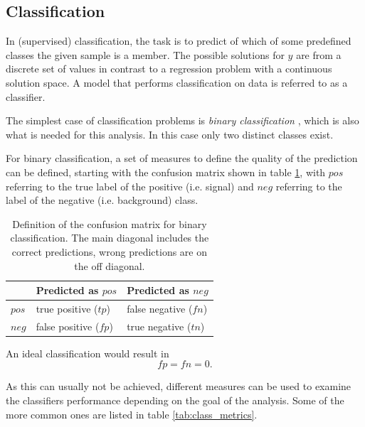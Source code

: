 \subsection{Classification}
In (supervised) classification, the task is to predict of which of some
predefined classes the given sample is a member. The possible solutions for $y$
are from a discrete set of values in
contrast to a regression problem with a continuous solution space.
A model that performs classification on data is referred to as a
classifier.

The simplest case of classification problems
is \textit{binary classification} \cite{sokolova2009systematic},
which is also what is needed for this analysis.
In this case only two distinct
classes exist.

For binary classification, a set of measures
to define the quality of the prediction can be defined, starting with the confusion matrix
shown in table \ref{tab:confusion},
with $pos$ referring to the true label of the positive (i.e. signal)
and $neg$ referring to the label of the negative (i.e. background) class.

\begin{table}
    \caption{Definition of the confusion matrix for binary classification.
    The main diagonal includes the correct predictions, wrong predictions are on the off diagonal.}
    \begin{center}
        \begin{tabular}{ l| l l}
            {} & Predicted as $pos$ & Predicted as $neg$ \\
            \hline
            $pos$ & true positive ($tp$) & false negative ($fn$) \\
            $neg$ & false positive ($fp$) & true negative ($tn$) \\
        \end{tabular}
    \end{center}
    \label{tab:confusion}
\end{table}

An ideal classification would result in
\begin{equation*}
  fp = fn = 0.
\end{equation*}

As this can usually not be achieved, different measures
can be used to examine the classifiers performance
depending on the goal of the analysis.
Some of the more common ones are listed in table \ref{tab:class_metrics}.

